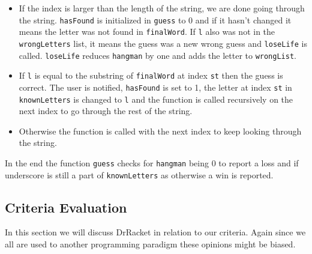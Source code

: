 \begin{itemize}
\item If the index is larger than the length of the string, we are done going through the string.
\lstinline!hasFound! is initialized in \lstinline!guess! to 0 and if it hasn't changed it means the letter was not found in \lstinline!finalWord!.
If \lstinline!l! also was not in the \lstinline!wrongLetters! list, it means the guess was a new wrong guess and \lstinline!loseLife! is called.
\lstinline!loseLife! reduces \lstinline!hangman! by one and adds the letter to \lstinline!wrongList!.
\item If \lstinline!l! is equal to the substring of \lstinline!finalWord! at index \lstinline!st! then the guess is correct.
The user is notified, \lstinline!hasFound! is set to 1, the letter at index \lstinline!st! in \lstinline!knownLetters! is changed to \lstinline!l! and the function is called recursively on the next index to go through the rest of the string.
\item Otherwise the function is called with the next index to keep looking through the string.
\end{itemize}

In the end the function \lstinline!guess! checks for \lstinline!hangman! being 0 to report a loss and if underscore is still a part of \lstinline!knownLetters! as otherwise a win is reported.

\subsection{Criteria Evaluation}
In this section we will discuss DrRacket in relation to our criteria. Again since we all are used to another programming paradigm these opinions might be biased.


